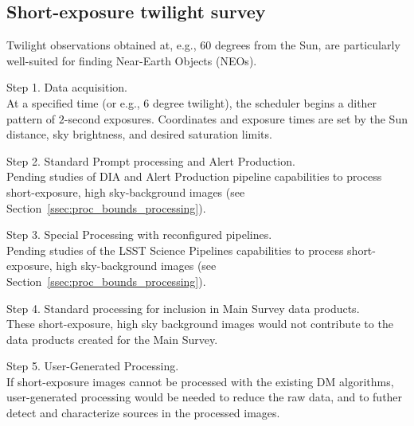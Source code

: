 \subsection{Short-exposure twilight survey}\label{ssec:SPCS_Twilight}

Twilight observations obtained at, e.g., 60 degrees from the Sun, are particularly
well-suited for finding Near-Earth Objects (NEOs).

Step 1. Data acquisition. \\
At a specified time (or e.g., 6 degree twilight), the scheduler begins a dither pattern of 
$2$-second exposures. 
Coordinates and exposure times are set by the Sun distance, sky brightness, and desired saturation limits.

Step 2. Standard Prompt processing and Alert Production. \\
Pending studies of DIA and Alert Production pipeline capabilities to process 
short-exposure, high sky-background images (see Section~\ref{ssec:proc_bounds_processing}).

Step 3. Special Processing with reconfigured pipelines. \\
Pending studies of the LSST Science Pipelines capabilities to process 
short-exposure, high sky-background images (see Section~\ref{ssec:proc_bounds_processing}).

Step 4. Standard processing for inclusion in Main Survey data products. \\
These short-exposure, high sky background images would not contribute to the data products created for the Main Survey.

Step 5. User-Generated Processing. \\
If short-exposure images cannot be processed with the existing DM algorithms, 
user-generated processing would be needed to reduce the raw data, and to 
futher detect and characterize sources in the processed images.



